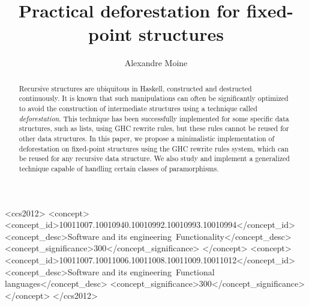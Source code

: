 \documentclass[format=sigplan, review=true, anonymous=true]{acmart}
\begin{document}
\title{Practical deforestation for fixed-point structures}
\author{Alexandre Moine}


\begin{abstract}
Recursive structures are ubiquitous in Haskell, constructed and destructed continuously. It is known that such manipulations can often be significantly optimized to avoid the construction of intermediate structures using a technique called \emph{deforestation}. This technique has been successfully implemented for some specific data structures, such as lists, using GHC rewrite rules, but these rules cannot be reused for other data structures. In this paper, we propose a minimalistic implementation of deforestation on fixed-point structures using the GHC rewrite rules system, which can be reused for any recursive data structure. We also study and implement a generalized technique capable of handling certain classes of paramorphisms.
\end{abstract}

%

\begin{CCSXML}
	<ccs2012>
	<concept>
	<concept_id>10011007.10010940.10010992.10010993.10010994</concept_id>
	<concept_desc>Software and its engineering~Functionality</concept_desc>
	<concept_significance>300</concept_significance>
	</concept>
	<concept>
	<concept_id>10011007.10011006.10011008.10011009.10011012</concept_id>
	<concept_desc>Software and its engineering~Functional languages</concept_desc>
	<concept_significance>300</concept_significance>
	</concept>
	</ccs2012>
\end{CCSXML}



%


%
\maketitle
\end{document}
